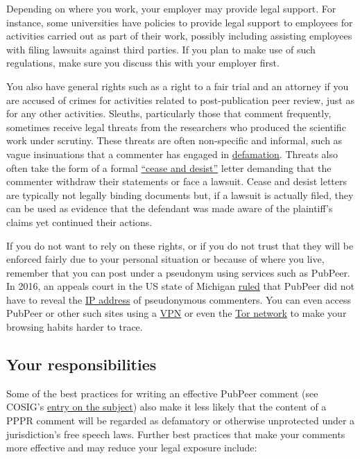 \documentclass[letterpaper, 12pt]{article}
\begin{document}
Depending on where you work, your employer may provide legal support.
For instance, some universities have policies to provide legal support to employees for activities carried out as part of their work,
possibly including assisting employees with filing lawsuits against third parties.
If you plan to make use of such regulations, make sure you discuss this with your employer first.

You also have general rights such as a right to a fair trial and an attorney if you are accused of crimes for activities related to post-publication peer review, just as for any other activities.
Sleuths, particularly those that comment frequently, sometimes receive legal threats from the researchers who produced the scientific work under scrutiny. These threats are often non-specific and informal, such as vague insinuations that a commenter has engaged in \href{https://dictionary.justia.com/defamation}{defamation}. Threats also often take the form of a formal \href{https://www.csulb.edu/college-of-business/legal-resource-center/article/cease-and-desist-letters-defined-usage-and}{``cease and desist''} letter demanding that the commenter withdraw their statements or face a lawsuit. Cease and desist letters are typically not legally binding documents but, if a lawsuit is actually filed, they can be used as evidence that the defendant was made aware of the plaintiff's claims yet continued their actions.

If you do not want to rely on these rights, or if you do not trust that they will be enforced fairly due to your personal situation or because of where you live, remember that you can post under a pseudonym using services such as PubPeer. In 2016, an appeals court in the US state of Michigan \href{https://retractionwatch.com/2016/12/07/pubpeer-wins-appeal-court-ruling-unmask-commenters/}{ruled} that PubPeer did not have to reveal the \href{https://en.wikipedia.org/wiki/IP_address}{IP address} of pseudonymous commenters. You can even access PubPeer or other such sites using a \href{https://en.wikipedia.org/wiki/VPN_service}{VPN} or even the \href{https://torproject.org/}{Tor network} to make your browsing habits harder to trace.


\subsection*{Your responsibilities}

Some of the best practices for writing an effective PubPeer comment (see COSIG's \href{https://osf.io/sghaq}{entry on the subject}) also make it less likely that the content of a PPPR comment will be regarded as defamatory or otherwise unprotected under a jurisdiction's free speech laws.
Further best practices that make your comments more effective and may reduce your legal exposure include:
\end{document}
